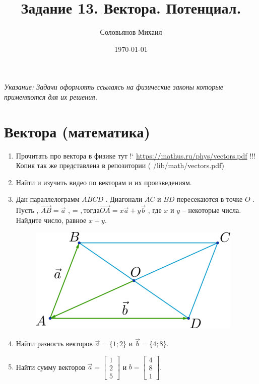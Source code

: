 \documentclass[a4paper,12pt]{article} %
\author{Соловьянов Михаил }
\title{Задание 13. Вектора. Потенциал.}
\date{\today}
\begin{document}
\maketitle



\textit{Указание: Задачи оформлять ссылаясь на физические законы которые применяются для их решения.}




\section{Вектора (математика)}
\begin{enumerate}

	\item Прочитать про вектора в физике тут !` \url{https://mathus.ru/phys/vectors.pdf} !!! Копия так же представлена в репозитории ( /lib/math/vectors.pdf) 

	\item Найти и изучить видео по векторам и их произведениям.

	\item Дан параллелограмм $ ABCD $ . Диагонали $AC $ и $ BD $ пересекаются в точке $ O $ . Пусть , $ \vec{AB} = \vec{a} $ ,  =  $ , тогда \vec{OA} = x\vec{a} + y\vec{b} $ , где $ x$  и $y $ – некоторые числа. Найдите число, равное $ x + y$.


	\begin{figure}[H]
	\centering
	  \includegraphics[width=0.5\linewidth]{vector1.png}
	  \caption{ }
	  \label{task1}
	\end{figure}

	
	\item  Найти разность векторов $ \vec{a} = \{1; 2\} $ и  $\vec{b} = \{4; 8\}$.


	\item Найти сумму векторов  $ \vec{a}= \begin{bmatrix}1\\ 2 \\ 5 \end{bmatrix} $ и $ b = \begin{bmatrix}4\\ 8 \\ 1 \end{bmatrix}$. 


\end{enumerate}
\end{document}
